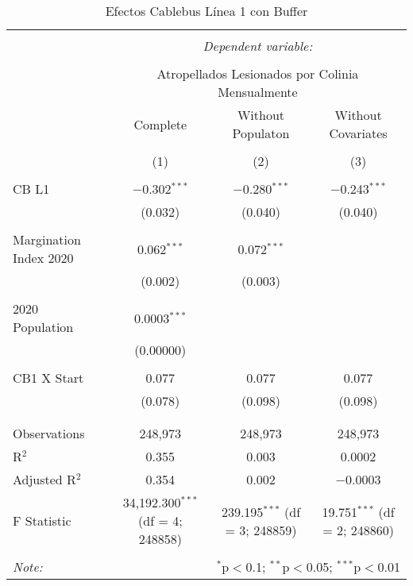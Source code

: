 
\begin{table}[!htbp] \centering 
  \caption{Efectos Cablebus Línea 1 con Buffer} 
  \label{} 
\begin{tabular}{@{\extracolsep{5pt}}lccc} 
\\[-1.8ex]\hline 
\hline \\[-1.8ex] 
 & \multicolumn{3}{c}{\textit{Dependent variable:}} \\ 
\cline{2-4} 
\\[-1.8ex] & \multicolumn{3}{c}{Atropellados Lesionados por Colinia Mensualmente} \\ 
 & Complete & Without Populaton & Without Covariates \\ 
\\[-1.8ex] & (1) & (2) & (3)\\ 
\hline \\[-1.8ex] 
 CB L1 & $-$0.302$^{***}$ & $-$0.280$^{***}$ & $-$0.243$^{***}$ \\ 
  & (0.032) & (0.040) & (0.040) \\ 
  & & & \\ 
 Margination Index 2020 & 0.062$^{***}$ & 0.072$^{***}$ &  \\ 
  & (0.002) & (0.003) &  \\ 
  & & & \\ 
 2020 Population & 0.0003$^{***}$ &  &  \\ 
  & (0.00000) &  &  \\ 
  & & & \\ 
 CB1 X Start & 0.077 & 0.077 & 0.077 \\ 
  & (0.078) & (0.098) & (0.098) \\ 
  & & & \\ 
\hline \\[-1.8ex] 
Observations & 248,973 & 248,973 & 248,973 \\ 
R$^{2}$ & 0.355 & 0.003 & 0.0002 \\ 
Adjusted R$^{2}$ & 0.354 & 0.002 & $-$0.0003 \\ 
F Statistic & 34,192.300$^{***}$ (df = 4; 248858) & 239.195$^{***}$ (df = 3; 248859) & 19.751$^{***}$ (df = 2; 248860) \\ 
\hline 
\hline \\[-1.8ex] 
\textit{Note:}  & \multicolumn{3}{r}{$^{*}$p$<$0.1; $^{**}$p$<$0.05; $^{***}$p$<$0.01} \\ 
\end{tabular} 
\end{table} 
